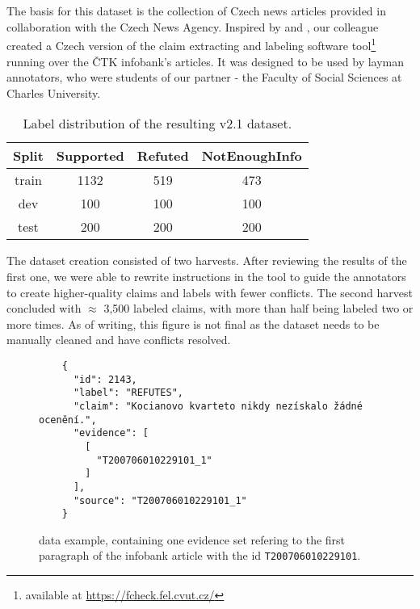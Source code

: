 \section{\CTK}

The basis for this dataset is the collection of Czech news articles provided in collaboration with the Czech News Agency. 
Inspired by \cite{fever} and \cite{danish_fever}, our colleague \cite{ullrich} created a Czech version of the claim extracting and labeling software tool\footnote{available at \url{https://fcheck.fel.cvut.cz/}} running over the ČTK infobank's articles. 
It was designed to be used by layman annotators, who were students of our partner - the Faculty of Social Sciences at Charles University.

\begin{table}[h!]
\centering
\begin{tabular}{c || c c c}
    Split & Supported & Refuted & NotEnoughInfo \\
    \hline
    train & 1132 & 519 & 473 \\
    dev & 100 & 100 & 100 \\
    test & 200 & 200 & 200
\end{tabular}
\caption[\CTK{} Dataset Label Distribution]{Label distribution of the resulting \CTK{} v2.1 dataset.}
\end{table}

The dataset creation consisted of two harvests. 
After reviewing the results of the first one, we were able to rewrite instructions in the tool to guide the annotators to create higher-quality claims and labels with fewer conflicts.
The second harvest concluded with $\approx$ 3,500 labeled claims, with more than half being labeled two or more times. %
As of writing, this figure is not final as the dataset needs to be manually cleaned and have conflicts resolved. 

\begin{figure}[h!]
    \begin{framed}
    \begin{verbatim}
    {
      "id": 2143,
      "label": "REFUTES",
      "claim": "Kocianovo kvarteto nikdy nezískalo žádné ocenění.",
      "evidence": [
        [
          "T200706010229101_1"
        ]
      ],
      "source": "T200706010229101_1"
    }\end{verbatim}
    \vspace{-0.4cm}
    \end{framed}
    \caption[\CTK{} Dataset Example]{\CTK{} data example, containing one evidence set refering to the first paragraph of the \CTK{} infobank article with the id \texttt{T200706010229101}.}
    \label{fig:ctk_example}
\end{figure}


